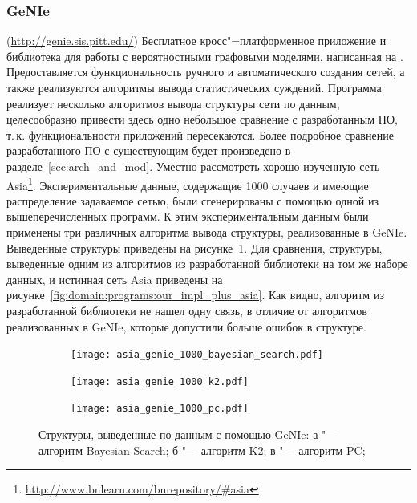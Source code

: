\subsubsection{GeNIe }
\label{sub:domain:existing_programs:genie}
(\url{http://genie.sis.pitt.edu/}) 
Бесплатное кросс"=платформенное приложение и библиотека для работы с вероятностными графовыми моделями, написанная на \cpp{}.
Предоставляется функциональность ручного и автоматического создания сетей, а также реализуются алгоритмы вывода статистических суждений.
Программа реализует несколько алгоритмов вывода структуры сети по данным, целесообразно привести здесь одно небольшое сравнение с разработанным ПО, т.\,к. функциональности приложений пересекаются.
Более подробное сравнение разработанного ПО с существующим будет произведено в разделе~\ref{sec:arch_and_mod}.
Уместно рассмотреть хорошо изученную сеть Asia\footnote{\url{http://www.bnlearn.com/bnrepository/\#asia}}.
Экспериментальные данные, содержащие \num{1000} случаев и имеющие распределение задаваемое сетью, были сгенерированы с помощью одной из вышеперечисленных программ.
К этим экспериментальным данным были применены три различных алгоритма вывода структуры, реализованные в GeNIe.
Выведенные структуры приведены на рисунке~\ref{fig:domain:programs:genie_infered_structrures}.
Для сравнения, структуры, выведенные одним из алгоритмов из разработанной библиотеки на том же наборе данных, и истинная сеть Asia приведены на рисунке~\ref{fig:domain:programs:our_impl_plus_asia}.
Как видно, алгоритм из разработанной библиотеки не нашел одну связь, в отличие от алгоритмов реализованных в GeNIe, которые допустили больше ошибок в структуре.

\begin{figure}[ht]
\centering
  \begin{subfigure}[b]{0.51\textwidth} 
    \centering
    \texttt{[image: asia\_genie\_1000\_bayesian\_search.pdf]}  
    \caption{}
  \end{subfigure}
  \begin{subfigure}[b]{0.48\textwidth} 
    \centering
    \texttt{[image: asia\_genie\_1000\_k2.pdf]}  
    \caption{}
  \end{subfigure}
  \begin{subfigure}[b]{0.9\textwidth} 
    \centering
    \texttt{[image: asia\_genie\_1000\_pc.pdf]}  
    \caption{}
  \end{subfigure}
  \caption{ Структуры, выведенные по данным с помощью GeNIe: а "--- алгоритм Bayesian Search;
            б "--- алгоритм K2;
            в "--- алгоритм PC;}
  \label{fig:domain:programs:genie_infered_structrures}
\end{figure}


